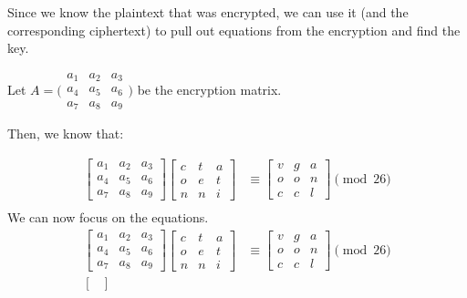 \begin{Answer}

Since we know the plaintext that was encrypted, we can use it (and the corresponding ciphertext)
to pull out equations from the encryption and find the key.

\noindent
Let $A = \big(\begin{smallmatrix}
  a_1 & a_2 & a_3 \\
  a_4 & a_5 & a_6 \\
  a_7 & a_8 & a_9
\end{smallmatrix}\big)$ be the encryption matrix.

\noindent
Then, we know that:

\begin{align*}
  \begin{bmatrix}
    a_1 & a_2 & a_3 \\
    a_4 & a_5 & a_6 \\
    a_7 & a_8 & a_9
  \end{bmatrix} \begin{bmatrix}
      c & t & a\\
      o & e & t\\
      n & n & i
    \end{bmatrix} &\equiv \begin{bmatrix}
      v & g & a\\
      o & o & n\\
      c & c & l
    \end{bmatrix} \pmod{26}\\
  \end{align*}
  \noindent
  We can now focus on the equations.
  \begin{align*}
    \begin{bmatrix}
      a_1 & a_2 & a_3 \\
      a_4 & a_5 & a_6 \\
      a_7 & a_8 & a_9
    \end{bmatrix} \begin{bmatrix}
        c & t & a\\
        o & e & t\\
        n & n & i
      \end{bmatrix} &\equiv \begin{bmatrix}
        v & g & a\\
        o & o & n\\
        c & c & l
    \end{bmatrix} \pmod{26}\\
    \begin{bmatrix}

\end{bmatrix}
\end{align*}
\end{Answer}
